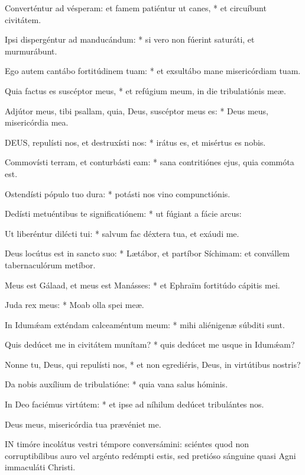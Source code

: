 Converténtur ad vésperam: et famem patiéntur ut canes, * et circuíbunt civitátem.

Ipsi dispergéntur ad manducándum: * si vero non fúerint saturáti, et murmurábunt.

Ego autem cantábo fortitúdinem tuam: * et exsultábo mane misericórdiam tuam.

Quia factus es suscéptor meus, * et refúgium meum, in die tribulatiónis meæ.

Adjútor meus, tibi psallam, quia, Deus, suscéptor meus es: * Deus meus, misericórdia mea.


\lettrine[lines=2]{D}{EUS}, repulísti nos, et destruxísti nos: * irátus es, et misértus es nobis.

Commovísti terram, et conturbásti eam: * sana contritiónes ejus, quia commóta est.

Ostendísti pópulo tuo dura: * potásti nos vino compunctiónis.

Dedísti metuéntibus te significatiónem: * ut fúgiant a fácie arcus:

Ut liberéntur dilécti tui: * salvum fac déxtera tua, et exáudi me.

Deus locútus est in sancto suo: * Lætábor, et partíbor Síchimam: et convállem tabernaculórum metíbor.

Meus est Gálaad, et meus est Manásses: * et Ephraïm fortitúdo cápitis mei.

Juda rex meus: * Moab olla spei meæ.

In Idumǽam exténdam calceaméntum meum: * mihi aliénigenæ súbditi sunt.

Quis dedúcet me in civitátem munítam? * quis dedúcet me usque in Idumǽam?

Nonne tu, Deus, qui repulísti nos, * et non egrediéris, Deus, in virtútibus nostris?

Da nobis auxílium de tribulatióne: * quia vana salus hóminis.

In Deo faciémus virtútem: * et ipse ad níhilum dedúcet tribulántes nos.

 Deus meus, misericórdia tua prævéniet me.



\lettrine[lines=2]{I}{N} timóre incolátus vestri témpore conversámini: sciéntes quod non corruptibílibus auro vel argénto redémpti estis, sed pretióso sánguine quasi Agni immaculáti Christi.

